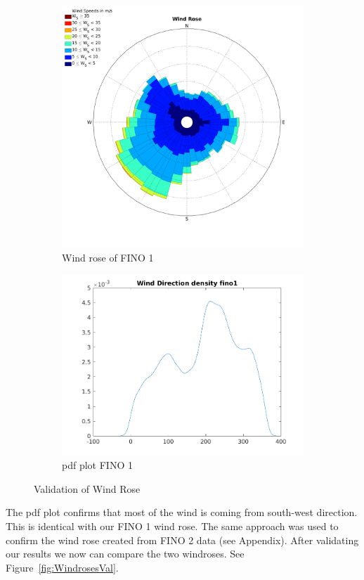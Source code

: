 \documentclass[10pt]{article}
\begin{document}
\begin{figure}[htb!]

\begin{subfigure}{0.42\textwidth}
  \centering
  \includegraphics[width=1\linewidth]{../figures/WindRose_Fino1.png}
  \caption{Wind rose of FINO 1}
\end{subfigure}
\begin{subfigure}{0.58\textwidth}
  \centering
  \includegraphics[width=1\linewidth]{../figures/Validation_WindRose_Fino1.png}
  \caption{pdf plot FINO 1}
\end{subfigure}
  \caption{Validation of Wind Rose}
\label{fig:WindroseValidation}
\end{figure}
\newpage
The pdf plot confirms that most of the wind is coming from south-west direction. This is identical with our FINO 1 wind rose. The same approach was used to confirm the wind rose created from FINO 2 data (see Appendix).
After validating our results we now can compare the two windroses. See Figure~\ref{fig:WindrosesVal}.
\end{document}

